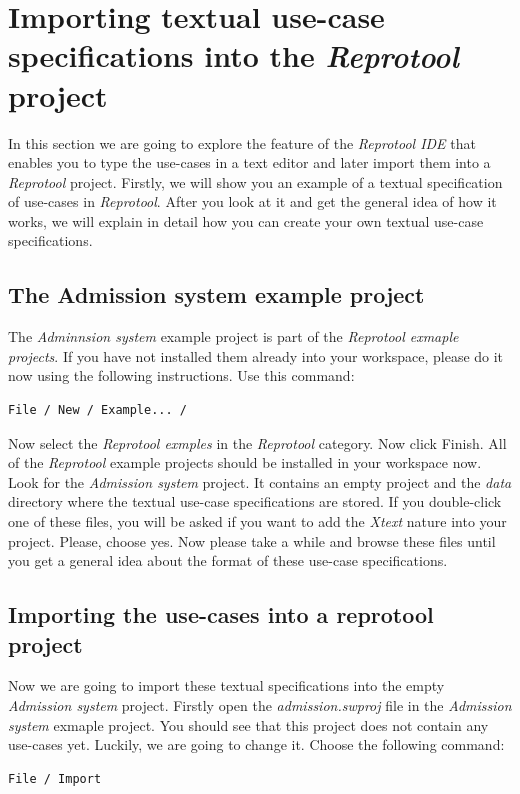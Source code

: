 \section{Importing textual use-case specifications into the \emph{Reprotool} project}

In this section we are going to explore the feature of the \emph{Reprotool IDE} that enables you to type the use-cases in a text
editor and later import them into a \emph{Reprotool} project. Firstly, we will show you an example of a textual specification
of use-cases in \emph{Reprotool}. After you look at it and get the general idea of how it works, we will explain in detail how you can
create your own textual use-case specifications.

\subsection{The Admission system example project}

The \emph{Adminnsion system} example project is part of the \emph{Reprotool exmaple projects}. If you have not installed them
already into your workspace, please do it now using the following instructions. Use this command:
\begin{verbatim}
File / New / Example... /
\end{verbatim}

Now select the \emph{Reprotool exmples} in the \emph{Reprotool} category. Now click Finish. All of the \emph{Reprotool} example projects
should be installed in your workspace now. Look for the \emph{Admission system} project.
It contains an empty project and the \emph{data} directory where the textual use-case specifications are stored. If you double-click one
of these files, you will be asked if you want to add the \emph{Xtext} nature into your project. Please, choose yes. Now please take a
while and browse these files until you get a general idea about the format of these use-case specifications.

\subsection{Importing the use-cases into a reprotool project}

Now we are going to import these textual specifications into the empty \emph{Admission system} project. Firstly open the
\emph{admission.swproj} file in the \emph{Admission system} exmaple project. You should see that this project does not contain any
use-cases yet. Luckily, we are going to change it. Choose the following command:
\begin{verbatim}
File / Import
\end{verbatim}

